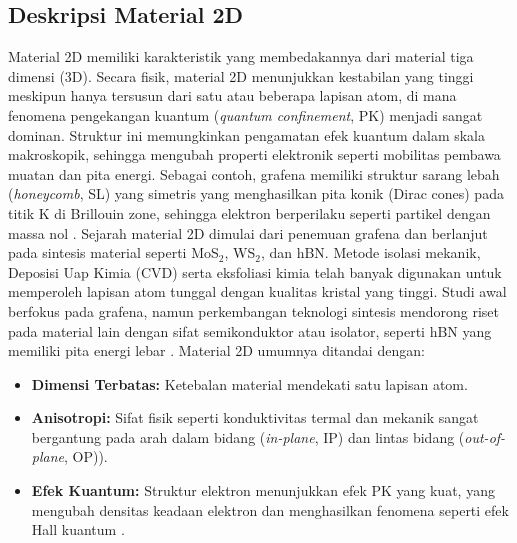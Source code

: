 \subsection{Deskripsi Material 2D}
Material 2D memiliki karakteristik yang membedakannya dari material tiga dimensi (3D).
Secara fisik, material 2D menunjukkan kestabilan yang tinggi meskipun hanya tersusun dari satu atau beberapa lapisan atom, di mana fenomena pengekangan kuantum (\textit{quantum confinement}, PK) menjadi sangat dominan.
Struktur ini memungkinkan pengamatan efek kuantum dalam skala makroskopik, sehingga mengubah properti elektronik seperti mobilitas pembawa muatan dan pita energi.
Sebagai contoh, grafena memiliki struktur sarang lebah (\textit{honeycomb}, SL) yang simetris yang menghasilkan pita konik (Dirac cones) pada titik K di Brillouin zone, sehingga elektron berperilaku seperti partikel dengan massa nol \citep{CastroNeto2009}.
Sejarah material 2D dimulai dari penemuan grafena dan berlanjut pada sintesis material seperti MoS\(_2\), WS\(_2\), dan hBN.
Metode isolasi mekanik, Deposisi Uap Kimia (CVD) serta eksfoliasi kimia telah banyak digunakan untuk memperoleh lapisan atom tunggal dengan kualitas kristal yang tinggi.
Studi awal berfokus pada grafena, namun perkembangan teknologi sintesis mendorong riset pada material lain dengan sifat semikonduktor atau isolator, seperti hBN yang memiliki pita energi lebar \citep{Geim2013}.
Material 2D umumnya ditandai dengan:
\begin{itemize}
    \item \textbf{Dimensi Terbatas:} Ketebalan material mendekati satu lapisan atom.
    \item \textbf{Anisotropi:} Sifat fisik seperti konduktivitas termal dan mekanik sangat bergantung pada arah dalam bidang (\emph{in-plane}, IP) dan lintas bidang (\emph{out-of-plane}, OP)).
    \item \textbf{Efek Kuantum:} Struktur elektron menunjukkan efek PK yang kuat, yang mengubah densitas keadaan elektron dan menghasilkan fenomena seperti efek Hall kuantum \citep{Das2015}.
\end{itemize}

